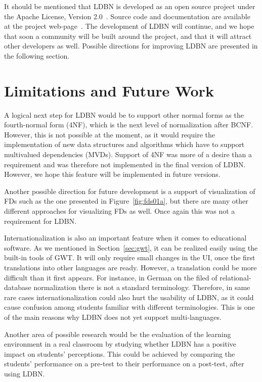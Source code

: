It should be mentioned that LDBN is developed as an open source project 
under the Apache License, Version 2.0~\cite{walv2}. 
Source code and documentation are available at the project web-page~\cite{wldbnp}. 
The development of LDBN will continue, and we
hope that soon a community will be
built around the project, and that it will attract other developers as well. Possible directions for 
improving LDBN are presented in the following section. 

\section{Limitations and Future Work}
A logical next step for LDBN would be to support
other normal forms as the fourth-normal form (4NF), which is the next level 
of normalization after BCNF.
However, this is not possible at the moment, as it would
require the implementation of new data structures and algorithms which have to 
support multivalued dependencies (MVDs). Support of 4NF was more of a desire than a requirement and
was therefore not implemented in the final version of LDBN. However, we hope this feature will be implemented
in future versions. 

Another possible direction for future development is a support of visualization of FDs such as the
one presented in Figure~\ref{fig:fds01a}, but there are many other different approaches for visualizing FDs as well.
Once again this was not a requirement for LDBN. 

Internationalization is also an important feature when it comes to educational software.
As we mentioned in Section~\ref{sec:gwt}, it can be realized easily using the built-in tools of GWT.
It will only require 
small changes in the UI, once the first translations into other languages are ready. However, a translation 
could be more difficult than it first appears. For instance, in German on the filed of relational-database
normalization
there is not a standard terminology. Therefore,
in same rare cases internationalization could also hurt the usability 
of LDBN, as it could cause confusion among students familiar with different terminologies.
This is one of the main reasons why LDBN does not yet support multi-languages.

Another area of possible research would be the evaluation of the learning environment 
in a real classroom by
studying whether LDBN has a positive impact on students' perceptions.
This could be achieved by comparing the students' performance on a pre-test to their
performance on a post-test, after using LDBN.  
